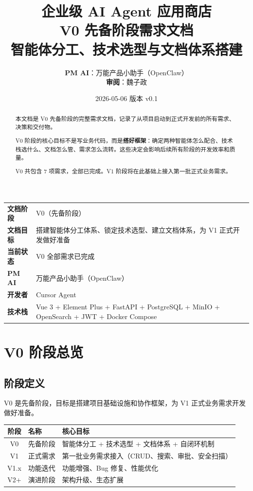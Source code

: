 \documentclass[11pt,a4paper]{article}
\title{
\vspace{-1em}
{\Huge\bfseries\color{primary} 企业级 AI Agent 应用商店}\\[0.8em]
{\Large\bfseries\color{accent} V0 先备阶段需求文档}\\[0.5em]
{\large 智能体分工、技术选型与文档体系搭建}
}
\author{
\textbf{PM AI}：万能产品小助手（OpenClaw）\\[0.3em]
\textbf{审阅}：魏子政
}
\date{2026-05-06 \quad 版本 v0.1}
\begin{document}
\maketitle
\thispagestyle{empty}

\begin{center}
\begin{tabular}{>{\bfseries}p{3cm} p{10cm}}
\toprule
文档阶段 & V0（先备阶段） \\
文档目标 & 搭建智能体分工体系、锁定技术选型、建立文档体系，为 V1 正式开发做好准备 \\
当前状态 & \textcolor{success}{V0 全部需求已完成} \\
PM AI & 万能产品小助手（OpenClaw） \\
开发者 & Cursor Agent \\
技术栈 & Vue 3 + Element Plus + FastAPI + PostgreSQL + MinIO + OpenSearch + JWT + Docker Compose \\
\bottomrule
\end{tabular}
\end{center}

\vspace{1.5em}

\begin{abstract}
本文档是 V0 先备阶段的完整需求文档，记录了从项目启动到正式开发前的所有需求、决策和交付物。

V0 阶段的核心目标不是写业务代码，而是\textbf{搭好框架}：确定两种智能体怎么配合、技术栈选什么、文档怎么管、需求怎么流转。这些决定会影响后续所有阶段的开发效率和质量。

V0 共包含 7 项需求，全部已完成。V1 阶段将在此基础上接入第一批正式业务需求。
\end{abstract}

\newpage
\tableofcontents
\newpage

\section{V0 阶段总览}

\subsection{阶段定义}

V0 是先备阶段，目标是搭建项目基础设施和协作框架，为 V1 正式业务需求开发做好准备。

\begin{table}[h]
\centering
\begin{tabular}{clp{6.5cm}}
\toprule
\textbf{阶段} & \textbf{名称} & \textbf{核心目标} \\
\midrule
V0 & 先备阶段 & 智能体分工 + 技术选型 + 文档体系 + 自闭环机制 \\
V1 & 正式需求 & 第一批业务需求接入（CRUD、搜索、审批、安全扫描） \\
V1.x & 功能迭代 & 功能增强、Bug 修复、性能优化 \\
V2+ & 演进阶段 & 架构升级、生态扩展 \\
\bottomrule
\end{tabular}
\end{table}
\end{document}
